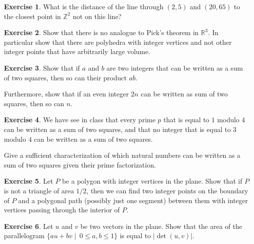 \documentclass[12pt,a4paper]{article}
\theoremstyle{plain}
\newtheorem*{Sol*}{Solution}
\theoremstyle{definition}
\newtheorem{Ex}{Exercise}
\newif\ifsolutions
\newcommand{\exercise}[2]{
			\begin{Ex} #1 \end{Ex}
			\ifsolutions  \begin{Sol*} #2 \end{Sol*} \bigskip \else \bigskip  \fi
		}
\begin{document}
\exercise{
 What is the distance of the line
through $(2,5)$ and $(20, 65)$ to the closest
point in $\mathbb{Z}^2$ not on this line?

}
{}

\exercise{
	 Show that there is no analogue to Pick's theorem in $\mathbb{R}^3$. In particular show that there are polyhedra with integer vertices and not other integer points that have arbitrarily large volume.

}
{}

\exercise{ 
	Show that if $a$ and $b$ are two integers that can be written as a sum of two squares, then so can their product $ab$.	

	Furthermore, show that if an even integer $2n$ can be written as sum of two squares, then so can $n$.
}
{}

\exercise{
	We have see in class that every prime $p$ that is equal to $1$ modulo $4$ can be written as a sum of two squares, and that no integer that is equal to $3$ modulo $4$ can be written as a sum of two squares.

	Give a sufficient characterization of which natural numbers can be written as a sum of two squares given their prime factorization.
}
{}

\exercise{
	Let $P$ be a polygon with integer vertices in the plane. Show that if $P$ is not a triangle of area $1/2$, then we can find two integer points on the boundary of $P$ and a polygonal path (possibly just one segment) between them with integer vertices passing through the interior of $P$.

}
{}

\exercise{
	Let $u$ and $v$ be two vectors in the plane. Show that the area of the parallelogram
	$\{au+bv \mid ~0 \leq a, b \leq 1\}$ is equal to $|\det(u,v)|$.
  }
{}
\end{document}
